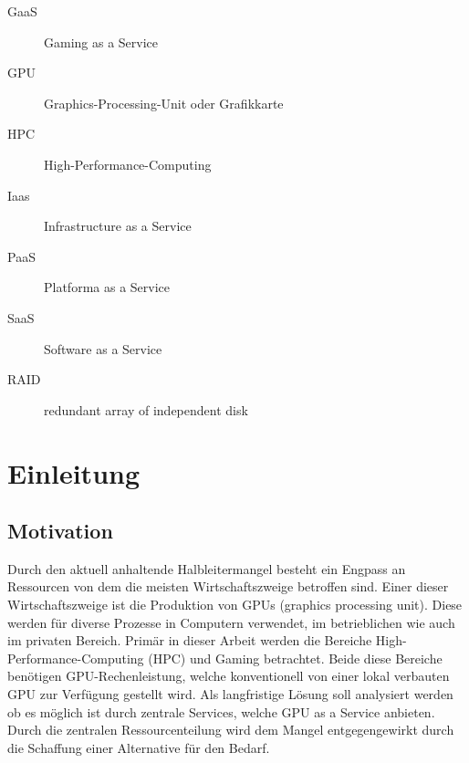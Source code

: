 \documentclass[12pt,toc=bib,toc=listof]{scrreprt}
\newcounter{savepage}
\begin{document}


\tableofcontents

\label{sec:abkuerzungsverzeichnis}

\begin{description}
\item[GaaS] Gaming as a Service
\item[GPU] Graphics-Processing-Unit oder Grafikkarte
\item[HPC] High-Performance-Computing
\item[Iaas] Infrastructure as a Service
\item[PaaS] Platforma as a Service 
\item[SaaS] Software as a Service
\item[RAID] redundant array of independent disk
\end{description}


\listoffigures


\newpage

\chapter{Einleitung} %
\label{sec:einleitung}


\section{Motivation} %
\label{sec:motivation}
Durch den aktuell anhaltende Halbleitermangel besteht ein Engpass an Ressourcen von dem die meisten Wirtschaftszweige betroffen sind.
Einer dieser Wirtschaftszweige ist die Produktion von GPUs (graphics processing unit). Diese werden für diverse Prozesse in Computern verwendet, im betrieblichen wie auch im privaten Bereich.
Primär in dieser Arbeit werden die Bereiche High-Performance-Computing (HPC) und Gaming betrachtet.
Beide diese Bereiche benötigen GPU-Rechenleistung, welche konventionell von einer lokal verbauten GPU zur Verfügung gestellt wird. 
Als langfristige Lösung soll analysiert werden ob es möglich ist durch zentrale Services, welche GPU as a Service anbieten. 
Durch die zentralen Ressourcenteilung wird dem Mangel entgegengewirkt durch die Schaffung einer Alternative für den Bedarf.
\end{document}
